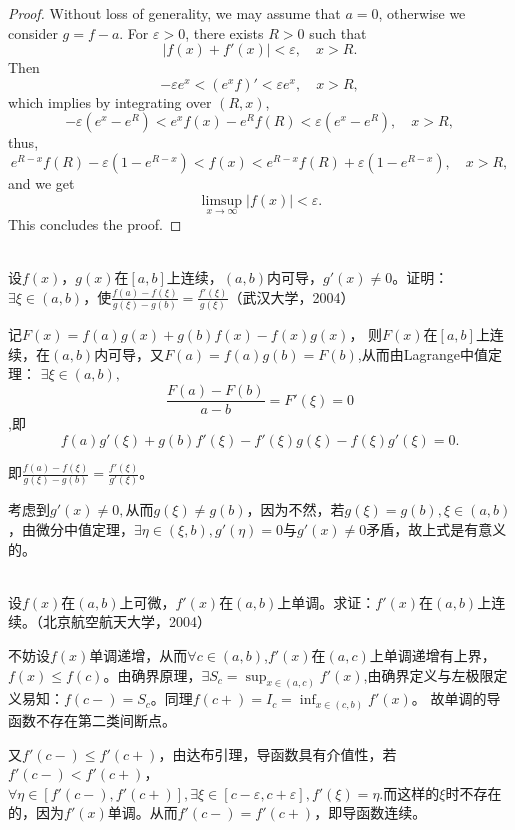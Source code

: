   \begin{proof}
    Without loss of generality, we may assume that $a=0$, otherwise we consider $g=f-a$.
  For $\varepsilon>0$, there exists $R>0$ such that 
  \[
  |f(x)+f'(x)| < \varepsilon,\quad x>R.
  \]
  Then 
  \[
  -\varepsilon e^x < \left(e^xf\right)' < \varepsilon e^x,\quad x>R,
  \]
  which implies by integrating over $(R, x)$,
  \[
  -\varepsilon (e^x - e^R) < e^xf(x) - e^Rf(R) < \varepsilon(e^x-e^R),\quad x>R,
  \]
  thus,
  \[
  e^{R-x}f(R) - \varepsilon(1-e^{R-x}) < f(x) < e^{R-x}f(R) + \varepsilon(1-e^{R-x}), \quad x>R,
  \]
  and we get 
  \[
  \limsup_{x\to\infty}|f(x)| < \varepsilon.
  \]
  This concludes the proof.
  \end{proof}



  \begin{example}
  \hfill\\
   设$f(x)$，$g(x)$在$[a,b]$上连续，$(a,b)$内可导，$g'(x)\neq0$。证明：$\exists\xi\in(a,b)$，使$\frac{f(a)-f(\xi)}{g(\xi)-g(b)}=\frac{f'(\xi)}{g(\xi)}$（武汉大学，2004）
  
  记$F(x)=f(a)g(x)+g(b)f(x)-f(x)g(x)$，
  则$F(x)$在$[a,b]$上连续，在$(a,b)$内可导，又$F(a)=f(a)g(b)=F(b)$,从而由Lagrange中值定理：
  $\exists\xi\in(a,b),$$$\frac{F(a)-F(b)}{a-b}=F'(\xi)=0$$,即$$f(a)g'(\xi)+g(b)f'(\xi)-f'(\xi)g(\xi)-f(\xi)g'(\xi)=0.$$
  
  即$\frac{f(a)-f(\xi)}{g(\xi)-g(b)}=\frac{f'(\xi)}{g'(\xi)}$。
  
  考虑到$g'(x)\neq 0,$从而$g(\xi)\neq g(b)$，因为不然，若$g(\xi)=g(b),\xi\in(a,b)$，由微分中值定理，$\exists\eta\in(\xi,b),g'(\eta)=0$与$g'(x)\neq0$矛盾，故上式是有意义的。
  \end{example}
  \begin{example}
  \hfill\\
   设$f(x)$在$(a,b)$上可微，$f'(x)$在$(a,b)$上单调。求证：$f'(x)$在$(a,b)$上连续。（北京航空航天大学，2004）
  
  不妨设$f(x)$单调递增，从而$\forall c\in(a,b)$,$f'(x)$在$(a,c)$上单调递增有上界，$f(x)\leq f(c)$。由确界原理，$\exists S_c=\sup_{x\in(a,c)}f'(x)$,由确界定义与左极限定义易知：$f(c-)=S_c$。同理$f(c+)=I_c=\inf_{x\in(c,b)}f'(x)$。
  故单调的导函数不存在第二类间断点。
  
  又$f'(c-)\leq f'(c+)$，由达布引理，导函数具有介值性，若$f'(c-)<f'(c+)$，$\forall\eta\in[f'(c-),f'(c+)],\exists\xi\in[c-\varepsilon,c+\varepsilon],f'(\xi)=\eta.$而这样的$\xi$时不存在的，因为$f'(x)$单调。从而$f'(c-)=f'(c+)$，即导函数连续。
  \end{example}
